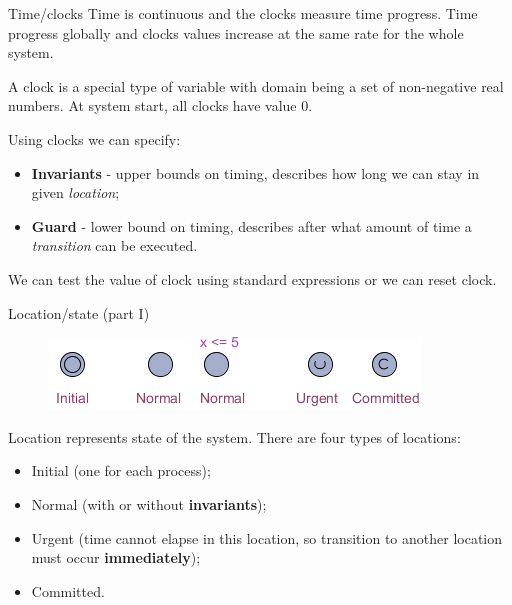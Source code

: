 \documentclass{beamer}
\begin{document}
\begin{frame}{Time/clocks}
	Time is continuous and the clocks measure time progress. Time progress globally and clocks values increase at the same rate for the whole system.\newline
	
	A clock is a special type of variable with domain being a set of non-negative real numbers. At system start, all clocks have value 0.\newline
	
	Using clocks we can specify:
	\begin{itemize}
		\item \textbf{Invariants} - upper bounds on timing, describes how long we can stay in given \textit{location};
		\item \textbf{Guard} - lower bound on timing, describes after what amount of time a \textit{transition} can be executed.
	\end{itemize}
	
	We can test the value of clock using standard expressions or we can reset clock.
\end{frame}

\begin{frame}{Location/state (part I)}
	\begin{figure}[H]
		\includegraphics[scale=1]{img/uppaal_locations.png}
	\end{figure}
	
	Location represents state of the system. There are four types of locations:
	\begin{itemize}
		\item Initial (one for each process);
		\item Normal (with or without \textbf{invariants});
		\item Urgent (time cannot elapse in this location, so transition to another location must occur \textbf{immediately});
		\item Committed.
	\end{itemize}
\end{frame}
\end{document}
